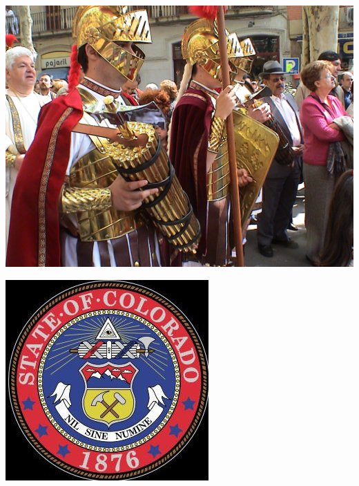 \begin{frame}
    \centering
    \includegraphics[width=.9\textwidth]{img/fasces/fake-fasces.jpg} \\
\end{frame}
\begin{frame}
    \centering
    \includegraphics[width=.9\textwidth]{img/fasces/fasces13.jpg} \\
\end{frame}
